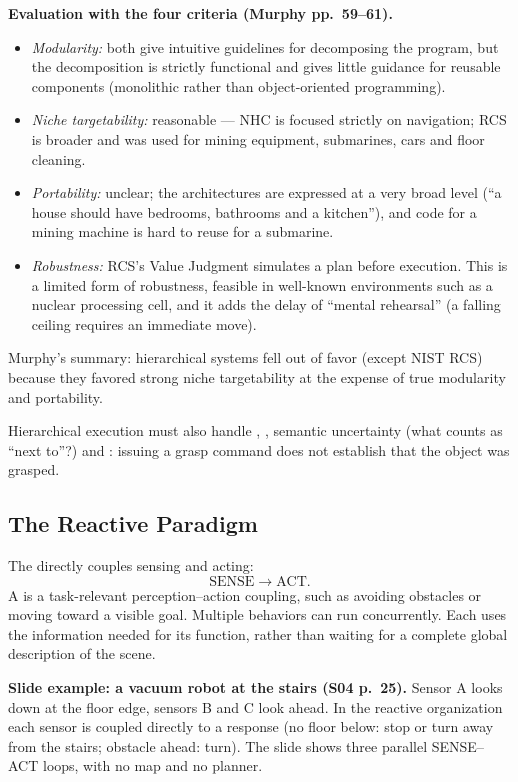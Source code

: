 \textbf{Evaluation with the four criteria (Murphy pp.~59--61).}
\begin{itemize}
\item \emph{Modularity:} both give intuitive guidelines for decomposing the program, but the decomposition is strictly functional and gives little guidance for reusable components (monolithic rather than object-oriented programming).
\item \emph{Niche targetability:} reasonable --- NHC is focused strictly on navigation; RCS is broader and was used for mining equipment, submarines, cars and floor cleaning.
\item \emph{Portability:} unclear; the architectures are expressed at a very broad level (``a house should have bedrooms, bathrooms and a kitchen''), and code for a mining machine is hard to reuse for a submarine.
\item \emph{Robustness:} RCS's Value Judgment simulates a plan before execution. This is a limited form of robustness, feasible in well-known environments such as a nuclear processing cell, and it adds the delay of ``mental rehearsal'' (a falling ceiling requires an immediate move).
\end{itemize}
Murphy's summary: hierarchical systems fell out of favor (except NIST RCS) because they favored strong niche targetability at the expense of true modularity and portability.

Hierarchical execution must also handle , , semantic uncertainty (what counts as ``next to''?) and : issuing a grasp command does not establish that the object was grasped.

\subsection{The Reactive Paradigm}
The  directly couples sensing and acting:
\[
 \text{SENSE}\longrightarrow\text{ACT}.
\]
A  is a task-relevant perception--action coupling, such as avoiding obstacles or moving toward a visible goal. Multiple behaviors can run concurrently. Each uses the information needed for its function, rather than waiting for a complete global description of the scene.

\textbf{Slide example: a vacuum robot at the stairs (S04 p.~25).} Sensor A looks down at the floor edge, sensors B and C look ahead. In the reactive organization each sensor is coupled directly to a response (no floor below: stop or turn away from the stairs; obstacle ahead: turn). The slide shows three parallel SENSE--ACT loops, with no map and no planner.

